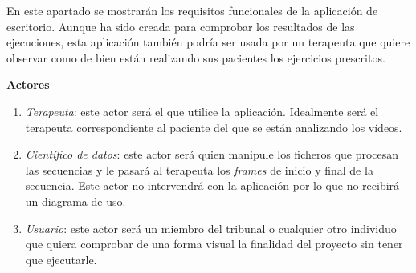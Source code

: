 En este apartado se mostrarán los requisitos funcionales de la aplicación de escritorio. Aunque ha sido creada para comprobar los resultados de las ejecuciones, esta aplicación también podría ser usada por un terapeuta que quiere observar como de bien están realizando sus pacientes los ejercicios prescritos.  

\textbf{Actores}
\begin{enumerate}
    \item \emph{Terapeuta}: este actor será el que utilice la aplicación. Idealmente será el terapeuta correspondiente al paciente del que se están analizando los vídeos.
    \item \emph{Científico de datos}: este actor será quien manipule los ficheros que procesan las secuencias y le pasará al terapeuta los \textit{frames} de inicio y final de la secuencia. Este actor no intervendrá con la aplicación por lo que no recibirá un diagrama de uso. 
    \item \emph{Usuario}: este actor será un miembro del tribunal o cualquier otro individuo que quiera comprobar de una forma visual la finalidad del proyecto sin tener que ejecutarle.
\end{enumerate}

